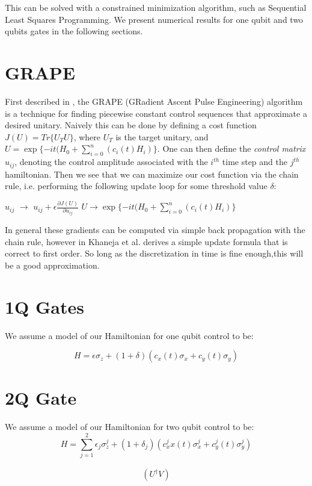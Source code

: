 \documentclass[aps,nofootinbib,pra,notitlepage,twocolumn]{revtex4-1}
\begin{document}
This can be solved with a constrained minimization algorithm, such as Sequential Least Squares Programming. We present numerical results for one qubit and two qubits gates in the following sections.

\section{GRAPE}
First described in \cite{Khaneja2005}, the GRAPE (GRadient Ascent Pulse Engineering) algorithm is a technique for finding piecewise constant control sequences that approximate a desired unitary. Naively this can be done by defining a cost function $J(U) = Tr\{U_TU\}$, where $U_T$ is the target unitary, and $U = \exp\{-it(H_0 + \sum_{i=0}^{n}(c_i(t)H_i)\}$. One can then define the \textit{control matrix} $u_{ij}$, denoting the control amplitude associated with the $i^{th}$ time step and the $j^{th}$ hamiltonian. Then we see that we can maximize our cost function via the chain rule, i.e. performing the following update loop for some threshold value $\delta$:

\begin{algorithmic}
\State $u_{ij}$ $\rightarrow$ $u_{ij} + \epsilon\frac{\partial J(U)}{\partial u_{ij}}$
\State $U \rightarrow \exp\{-it(H_0 + \sum_{i=0}^{n}(c_i(t)H_i)\}$
\EndWhile
\EndProcedure
\end{algorithmic}

In general these gradients can be computed via simple back propagation with the chain rule, however in \cite{Khaneja2005} Khaneja et al. derives a simple update formula that is correct to first order. So long as the discretization in time is fine enough,this will be a good approximation.

\section{1Q Gates}
We assume a model of our Hamiltonian for one qubit control to be:

$$ H = \epsilon\sigma_z + (1 + \delta)(c_x(t)\sigma_x + c_y(t)\sigma_y) $$

\section{2Q Gate}
We assume a model of our Hamiltonian for two qubit control to be:
$$H = \sum_{j=1}^2\epsilon_j\sigma_z^j + (1 + \delta_j)(c_x^jx(t)\sigma_x^j + c_y^j(t)\sigma_y^j)$$




\begin{align*}
    \left( U^\dagger V \right)
\end{align*}


\end{document}
